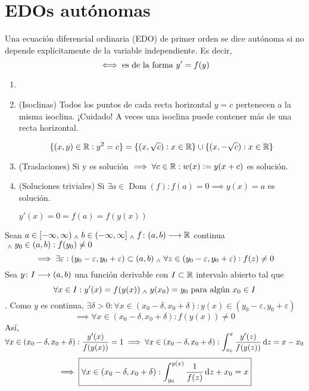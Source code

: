 \section{EDOs autónomas}

\begin{defn}
    Una ecuación diferencial ordinaria (EDO) de primer orden se dice autónoma si no depende explícitamente de la variable independiente. Es decir, 
    \[\iff \text{es de la forma } y'=f(y)\]
\end{defn}

\begin{prop}
    \begin{enumerate}
        \item[]
        \item (Isoclinas) Todos los puntos de cada recta horizontal $y=c$ pertenecen a la misma isoclina. ¡Cuidado! A veces una isoclina puede contener más de una recta horizontal.
        \begin{ejem}[$y'=y^2$]
            \[\{(x,y)\in \mathbb{R}:y^2=c\}=\{(x,\sqrt{c}):x\in\mathbb{R}\}\cup\{(x,-\sqrt{c}):x\in\mathbb{R}\}\]
        \end{ejem}
        \item (Traslaciones) Si y es solución $\implies \forall c \in \mathbb{R} : w(x)\vcentcolon= y(x+c)$ es solución.
        \item (Soluciones triviales) Si $\exists a \in \operatorname{Dom}(f) : f(a)=0 \implies y(x)=a$ es solución.
        \begin{dem}
            $y'(x)=0=f(a)=f(y(x))$
        \end{dem}
    \end{enumerate}
\end{prop}

\begin{teo}
    Sean $a\in [-\infty, \infty) \; _{\wedge} \; b\in (-\infty, \infty] \; _{\wedge} \; f \colon (a,b) \longrightarrow \mathbb{R}$ continua $ \; _{\wedge} \; y_0 \in (a,b) : f(y_0) \ne 0$
    \[\implies \exists \varepsilon : (y_0-\varepsilon, y_0+\varepsilon) \subset (a,b) \; _{\wedge} \; \forall z \in (y_0-\varepsilon, y_0+\varepsilon) : f(z)\ne 0\]
    Sea $y \colon I \longrightarrow (a,b)$ una función derivable con $I\subset \mathbb{R}$ intervalo abierto tal que
    $$\forall x \in I : y'(x)=f(y(x)) \; _{\wedge} \; y(x_0)=y_0 \text{ para algún }x_0 \in I$$.
    Como $y$ es continua, $\exists \delta > 0 : \forall x \in (x_0-\delta, x_0+\delta) :y(x)\in(y_0-\varepsilon, y_0+\varepsilon)$
    \[\implies \forall x \in (x_0-\delta, x_0+\delta) : f(y(x))\ne 0\]
    Así, $\ds \forall x \in (x_0-\delta, x_0+\delta) : \frac{y'(x)}{f(y(x))}=1 \implies \forall x \in (x_0-\delta, x_0+\delta) : \int_{x_0}^{x} \frac{y'(z)}{f(y(z))}\odif{z} = x-x_0$
    \[\implies \boxed{\forall x \in (x_0-\delta, x_0+\delta) : \int_{y_0}^{y(x)} \frac{1}{f(z)} \odif{z} + x_0 = x}\]
\end{teo}

